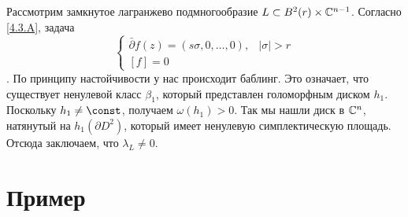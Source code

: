 Рассмотрим замкнутое лагранжево подмногообразие $L \subset B^2 (r) \times \mathbb{C}^{n-1}$.
Согласно \ref{4.3.A}, задача
\[
\begin{cases}
\bar\partial f(z)=(s\sigma,0,\dots,0),&|\sigma|>r
\\
[f]=0
\end{cases}
\]
. 
По принципу настойчивости у нас происходит баблинг.
Это означает, что существует ненулевой класс $\beta_1$, который представлен голоморфным диском $h_1$.
Поскольку $h_1 \z\ne \const$, получаем $\omega (h_1)> 0$.
Так мы нашли диск в $\mathbb{C}^n$, натянутый на $h_1 (\partial D^2)$, который имеет ненулевую симплектическую площадь.
Отсюда заключаем, что $\lambda_L \ne 0$.

\section{Пример}\label{sec:4.4}

